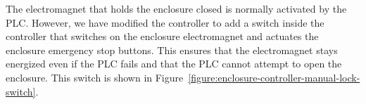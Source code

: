 
The electromagnet that holds the enclosure closed is normally activated by the PLC. However, we have modified the controller to add a switch inside the controller that switches on the enclosure electromagnet and actuates the enclosure emergency stop buttons. This ensures that the electromagnet stays energized even if the PLC fails and that the PLC cannot attempt to open the enclosure. This switch is shown in Figure~\ref{figure:enclosure-controller-manual-lock-switch}.

\begin{figure}
\begin{center}
\ifcoatli
{}
\fi
\ifddoti
\resizebox{\columnwidth}{!}{%
}
\end{center}
\end{figure}
